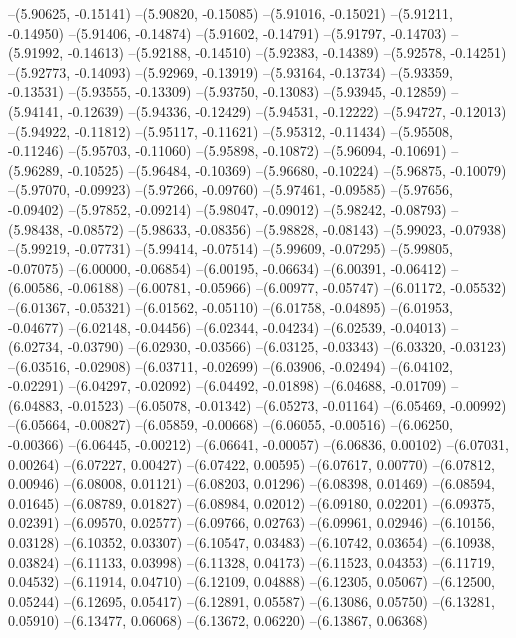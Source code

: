 --(5.90625, -0.15141)
--(5.90820, -0.15085)
--(5.91016, -0.15021)
--(5.91211, -0.14950)
--(5.91406, -0.14874)
--(5.91602, -0.14791)
--(5.91797, -0.14703)
--(5.91992, -0.14613)
--(5.92188, -0.14510)
--(5.92383, -0.14389)
--(5.92578, -0.14251)
--(5.92773, -0.14093)
--(5.92969, -0.13919)
--(5.93164, -0.13734)
--(5.93359, -0.13531)
--(5.93555, -0.13309)
--(5.93750, -0.13083)
--(5.93945, -0.12859)
--(5.94141, -0.12639)
--(5.94336, -0.12429)
--(5.94531, -0.12222)
--(5.94727, -0.12013)
--(5.94922, -0.11812)
--(5.95117, -0.11621)
--(5.95312, -0.11434)
--(5.95508, -0.11246)
--(5.95703, -0.11060)
--(5.95898, -0.10872)
--(5.96094, -0.10691)
--(5.96289, -0.10525)
--(5.96484, -0.10369)
--(5.96680, -0.10224)
--(5.96875, -0.10079)
--(5.97070, -0.09923)
--(5.97266, -0.09760)
--(5.97461, -0.09585)
--(5.97656, -0.09402)
--(5.97852, -0.09214)
--(5.98047, -0.09012)
--(5.98242, -0.08793)
--(5.98438, -0.08572)
--(5.98633, -0.08356)
--(5.98828, -0.08143)
--(5.99023, -0.07938)
--(5.99219, -0.07731)
--(5.99414, -0.07514)
--(5.99609, -0.07295)
--(5.99805, -0.07075)
--(6.00000, -0.06854)
--(6.00195, -0.06634)
--(6.00391, -0.06412)
--(6.00586, -0.06188)
--(6.00781, -0.05966)
--(6.00977, -0.05747)
--(6.01172, -0.05532)
--(6.01367, -0.05321)
--(6.01562, -0.05110)
--(6.01758, -0.04895)
--(6.01953, -0.04677)
--(6.02148, -0.04456)
--(6.02344, -0.04234)
--(6.02539, -0.04013)
--(6.02734, -0.03790)
--(6.02930, -0.03566)
--(6.03125, -0.03343)
--(6.03320, -0.03123)
--(6.03516, -0.02908)
--(6.03711, -0.02699)
--(6.03906, -0.02494)
--(6.04102, -0.02291)
--(6.04297, -0.02092)
--(6.04492, -0.01898)
--(6.04688, -0.01709)
--(6.04883, -0.01523)
--(6.05078, -0.01342)
--(6.05273, -0.01164)
--(6.05469, -0.00992)
--(6.05664, -0.00827)
--(6.05859, -0.00668)
--(6.06055, -0.00516)
--(6.06250, -0.00366)
--(6.06445, -0.00212)
--(6.06641, -0.00057)
--(6.06836, 0.00102)
--(6.07031, 0.00264)
--(6.07227, 0.00427)
--(6.07422, 0.00595)
--(6.07617, 0.00770)
--(6.07812, 0.00946)
--(6.08008, 0.01121)
--(6.08203, 0.01296)
--(6.08398, 0.01469)
--(6.08594, 0.01645)
--(6.08789, 0.01827)
--(6.08984, 0.02012)
--(6.09180, 0.02201)
--(6.09375, 0.02391)
--(6.09570, 0.02577)
--(6.09766, 0.02763)
--(6.09961, 0.02946)
--(6.10156, 0.03128)
--(6.10352, 0.03307)
--(6.10547, 0.03483)
--(6.10742, 0.03654)
--(6.10938, 0.03824)
--(6.11133, 0.03998)
--(6.11328, 0.04173)
--(6.11523, 0.04353)
--(6.11719, 0.04532)
--(6.11914, 0.04710)
--(6.12109, 0.04888)
--(6.12305, 0.05067)
--(6.12500, 0.05244)
--(6.12695, 0.05417)
--(6.12891, 0.05587)
--(6.13086, 0.05750)
--(6.13281, 0.05910)
--(6.13477, 0.06068)
--(6.13672, 0.06220)
--(6.13867, 0.06368)

